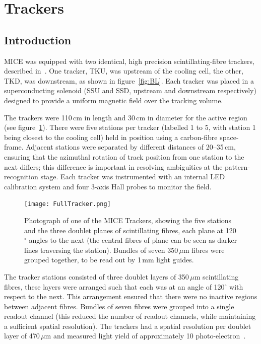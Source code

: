 \graphicspath{{06-Tracker/Figures/}}

\section{Trackers}
\label{Sect:Tracker}

\subsection{Introduction}
MICE was equipped with two identical, high precision scintillating-fibre trackers, described in~\cite{Ellis:2010bb}. One tracker, TKU, was upstream of the cooling cell, the other, TKD, was downstream, as shown in figure~\ref{fig:BL}.
Each tracker was placed in a superconducting solenoid (SSU and SSD, upstream and downstream respectively) designed to provide a uniform magnetic field over the tracking volume. 


The trackers were 110\,cm in length and 30\,cm in diameter for the active region (see figure~\ref{Figure:FullTracker}). There were five stations per tracker (labelled 1 to 5, with station 1 being closest to the cooling cell) held in position using a carbon-fibre space-frame.
Adjacent stations were separated by different distances of 20--35\,cm, ensuring that the azimuthal rotation of track position from one station to the next differs;
this difference is important in resolving ambiguities at the pattern-recognition stage. Each tracker was instrumented with an internal LED calibration system and four 3-axis Hall probes to monitor the field.

\begin{figure}[ht]
\begin{center}
\texttt{[image: FullTracker.png]}
\end{center}
\caption{Photograph of one of the MICE Trackers, showing the five stations and the three doublet planes of scintillating fibres, each plane at 120$^\circ$ angles to the next (the central fibres of plane can be seen as darker lines traversing the station). Bundles of seven 350\,$\mu$m fibres were grouped together, to be read out by 1\,mm light guides.}
\label{Figure:FullTracker}
\end{figure}

The tracker stations consisted of three doublet layers of 350\,$\mu$m scintillating fibres, these layers were arranged such that each was at an angle of 120$^\circ$ with respect to the next. This arrangement ensured that there were no inactive regions between adjacent fibres. Bundles of seven fibres were grouped into a single readout channel (this reduced the number of readout channels, while maintaining a sufficient spatial resolution). The trackers had a spatial resolution per doublet layer of 470\,$\mu$m and measured light yield of approximately 10 photo-electron~\cite{Ellis:2010bb}.

